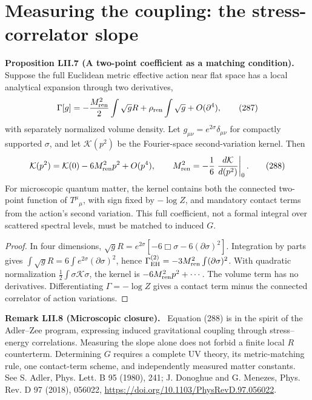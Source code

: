\documentclass[11pt,a4paper,oneside]{book}
\newcommand{\statement}[3]{\par\medskip\noindent\textbf{#1 #2 (#3).}\ }
\begin{document}
\section{Measuring the coupling: the stress-correlator slope}
\statement{Proposition}{LII.7}{A two-point coefficient as a matching condition}
Suppose the full Euclidean metric effective action near flat space has a local analytical expansion through two derivatives,
\begin{equation}\Gamma[g]=-\frac{M_{\rm ren}^2}2\int\sqrt gR+\rho_{\rm ren}\int\sqrt g+O(\partial^4),\tag{287}\end{equation}
with separately normalized volume density. Let $g_{\mu\nu}=e^{2\sigma}\delta_{\mu\nu}$ for compactly supported $\sigma$, and let $\mathcal K(p^2)$ be the Fourier-space second-variation kernel. Then
\begin{equation}\mathcal K(p^2)=\mathcal K(0)-6M_{\rm ren}^2p^2+O(p^4),\qquad M_{\rm ren}^2=-\frac16\left.\frac{d\mathcal K}{d(p^2)}\right|_{0}.\tag{288}\end{equation}
For microscopic quantum matter, the kernel contains both the connected two-point function of $T^\mu{}_{\mu}$, with sign fixed by $-\log Z$, and mandatory contact terms from the action's second variation. This full coefficient, not a formal integral over scattered spectral levels, must be matched to induced $G$.
\begin{proof}
In four dimensions, $\sqrt gR=e^{2\sigma}[-6\Box\sigma-6(\partial\sigma)^2]$. Integration by parts gives $\int\sqrt gR=6\int e^{2\sigma}(\partial\sigma)^2$, hence $\Gamma_{\rm EH}^{(2)}=-3M_{\rm ren}^2\int(\partial\sigma)^2$. With quadratic normalization $\frac12\int\sigma\mathcal K\sigma$, the kernel is $-6M_{\rm ren}^2p^2+\cdots$. The volume term has no derivatives. Differentiating $\Gamma=-\log Z$ gives a contact term minus the connected correlator of action variations.
\end{proof}
\statement{Remark}{LII.8}{Microscopic closure}
Equation (288) is in the spirit of the Adler--Zee program, expressing induced gravitational coupling through stress--energy correlations. Measuring the slope alone does not forbid a finite local $R$ counterterm. Determining $G$ requires a complete UV theory, its metric-matching rule, one contact-term scheme, and independently measured matter constants. See S. Adler, Phys. Lett. B 95 (1980), 241; J. Donoghue and G. Menezes, Phys. Rev. D 97 (2018), 056022, \url{https://doi.org/10.1103/PhysRevD.97.056022}.
\end{document}
